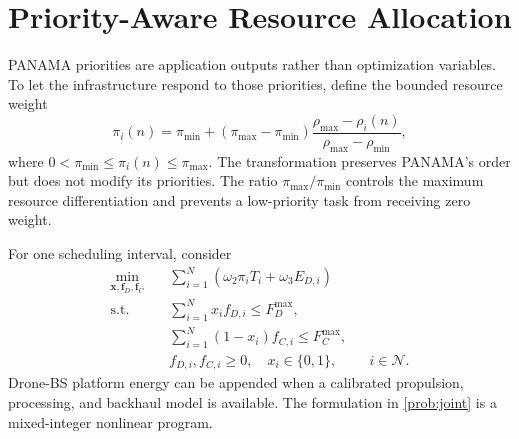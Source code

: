\IfFileExists{IEEEtran.cls}{\documentclass[conference]{IEEEtran}}{\documentclass[10pt,twocolumn]{article}}
\newif\iftrackchanges
\newcommand{\deleted}[1]{\iftrackchanges{\color{RevisionRed}#1}\fi}
\newcommand{\Nset}{\mathcal{N}}
\begin{document}
\section{Priority-Aware Resource Allocation}
PANAMA priorities are application outputs rather than optimization variables. To let the infrastructure respond to those priorities, define the bounded resource weight
\begin{equation}
    \pi_i(n)=\pi_{\min}+(\pi_{\max}-\pi_{\min})
    \frac{\rho_{\max}-\rho_i(n)}{\rho_{\max}-\rho_{\min}},
    \label{eq:priority_weight}
\end{equation}
where $0<\pi_{\min}\leq\pi_i(n)\leq\pi_{\max}$. The transformation preserves PANAMA's order but does not modify its priorities. The ratio $\pi_{\max}/\pi_{\min}$ controls the maximum resource differentiation and prevents a low-priority task from receiving zero weight.

For one scheduling interval, consider
\begin{subequations}\label{prob:joint}
\begin{align}
\min_{\boldsymbol{x},\boldsymbol{f}_D,\boldsymbol{f}_C}\quad
&\sum_{i=1}^{N}\left(\omega_2\pi_iT_i+\omega_3E_{D,i}\right) \\
\mathrm{s.t.}\quad
\iftrackchanges &{\color{RevisionRed}T_i\leq\tau_i}, &&i\in\Nset,\nonumber\\
\fi
&\sum_{i=1}^{N}x_if_{D,i}\leq F_D^{\max},\\
&\sum_{i=1}^{N}(1-x_i)f_{C,i}\leq F_C^{\max},\\
&f_{D,i},f_{C,i}\geq0,\quad x_i\in\{0,1\}, &&i\in\Nset.
\end{align}
\end{subequations}
\deleted{where $E_i^{\mathrm{tx}}=P_is_i/R_i^{\mathrm{G2A}}$.} Drone-BS platform energy can be appended when a calibrated propulsion, processing, and backhaul model is available. The formulation in \eqref{prob:joint} is a mixed-integer nonlinear program.
\end{document}
